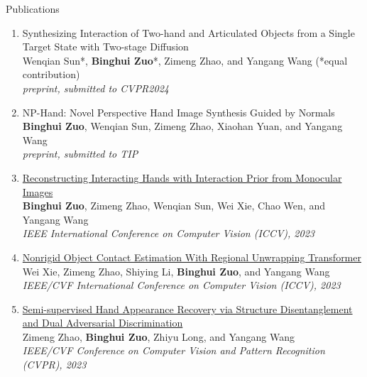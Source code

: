\documentclass{template_2311} %
\def\myname{\textbf{Binghui Zuo}}
\begin{document}
\begin{rSection}{Publications}
\begin{enumerate}
\item {Synthesizing Interaction of Two-hand and Articulated Objects from a Single  Target State with Two-stage Diffusion}\\
Wenqian Sun*, \myname*, Zimeng Zhao, and Yangang Wang  (*equal contribution)\\
\emph{preprint, submitted to CVPR2024} 

\item {NP-Hand: Novel Perspective Hand Image Synthesis Guided  by Normals} \\
\myname, Wenqian Sun, Zimeng Zhao, Xiaohan Yuan, and Yangang Wang \\
\emph{preprint, submitted to TIP}


\item \href{https://openaccess.thecvf.com/content/ICCV2023/papers/Zuo_Reconstructing_Interacting_Hands_with_Interaction_Prior_from_Monocular_Images_ICCV_2023_paper.pdf} {Reconstructing Interacting Hands with Interaction Prior from Monocular Images}\\
\myname, Zimeng Zhao, Wenqian Sun, Wei Xie, Chao Wen, and Yangang Wang \\
\emph{IEEE International Conference on Computer Vision (ICCV), 2023}

\item \href{https://openaccess.thecvf.com/content/ICCV2023/papers/Xie_Nonrigid_Object_Contact_Estimation_With_Regional_Unwrapping_Transformer_ICCV_2023_paper.pdf} {Nonrigid Object Contact Estimation With Regional Unwrapping Transformer} \\
Wei Xie, Zimeng Zhao, Shiying Li, \myname, and Yangang Wang \\
\emph{IEEE/CVF International Conference on Computer Vision (ICCV), 2023}

\item \href{https://openaccess.thecvf.com/content/CVPR2023/papers/Zhao_Semi-Supervised_Hand_Appearance_Recovery_via_Structure_Disentanglement_and_Dual_Adversarial_CVPR_2023_paper.pdf} {Semi-supervised Hand Appearance Recovery via Structure Disentanglement and Dual Adversarial Discrimination} \\
Zimeng Zhao, \myname, Zhiyu Long, and Yangang Wang\\
\emph{IEEE/CVF Conference on Computer Vision and Pattern Recognition (CVPR), 2023}


\end{enumerate}
\end{rSection}
\end{document}
